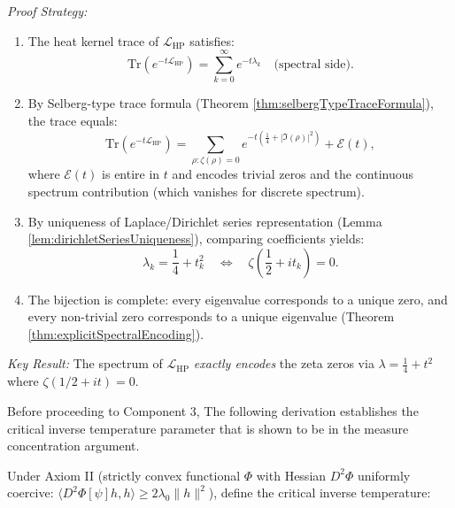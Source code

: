\begin{theorem}
\begin{enumerate}
\textit{Proof Strategy:}
\begin{enumerate}
\item[(2a)] The heat kernel trace of $\mathcal{L}_{\mathrm{HP}}$ satisfies:
\begin{equation}
\mathrm{Tr}(e^{-t\mathcal{L}_{\mathrm{HP}}}) = \sum_{k=0}^\infty e^{-t\lambda_k} \quad \text{(spectral side)}.
\end{equation}

\item[(2b)] By Selberg-type trace formula (Theorem \ref{thm:selbergTypeTraceFormula}), the trace equals:
\begin{equation}
\mathrm{Tr}(e^{-t\mathcal{L}_{\mathrm{HP}}}) = \sum_{\rho: \zeta(\rho)=0} e^{-t(\frac{1}{4} + |\Im(\rho)|^2)} + \mathcal{E}(t),
\end{equation}
where $\mathcal{E}(t)$ is entire in $t$ and encodes trivial zeros and the continuous spectrum contribution (which vanishes for discrete spectrum).

\item[(2c)] By uniqueness of Laplace/Dirichlet series representation (Lemma \ref{lem:dirichletSeriesUniqueness}), comparing coefficients yields:
\begin{equation}
\lambda_k = \frac{1}{4} + t_k^2 \quad \Leftrightarrow \quad \zeta\left(\frac{1}{2} + it_k\right) = 0.
\end{equation}

\item[(2d)] The bijection is complete: every eigenvalue corresponds to a unique zero, and every non-trivial zero corresponds to a unique eigenvalue (Theorem \ref{thm:explicitSpectralEncoding}).
\end{enumerate}

\textit{Key Result:} The spectrum of $\mathcal{L}_{\mathrm{HP}}$ \emph{exactly encodes} the zeta zeros via $\lambda = \frac{1}{4} + t^2$ where $\zeta(1/2 + it) = 0$.

Before proceeding to Component 3, The following derivation establishes the critical inverse temperature parameter that is shown to be in the measure concentration argument.

\begin{definition}
\label{def:criticalInverseTemperature}

Under Axiom II (strictly convex functional $\Phi$ with Hessian $D^2\Phi$ uniformly coercive: $\langle D^2\Phi[\psi] h, h \rangle \geq 2\lambda_0 \|h\|^2$), define the critical inverse temperature:


\end{definition}
\end{enumerate}
\end{theorem}
